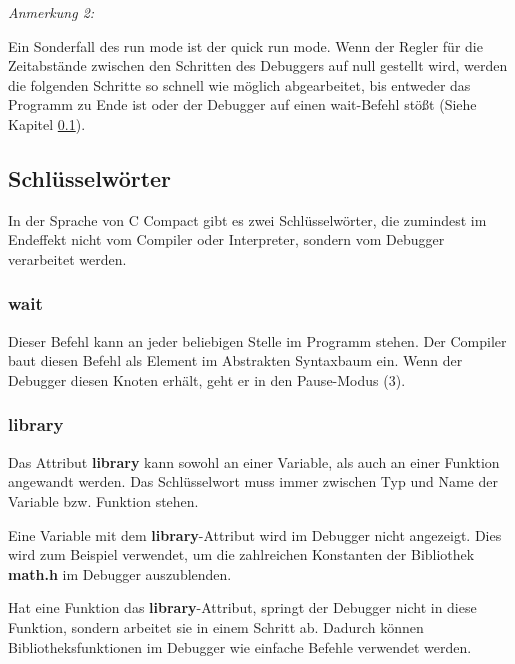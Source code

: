 \emph{Anmerkung 2:}
\par
\begingroup
\leftskip=1cm %
\noindent Ein Sonderfall des run mode ist der \glqq{}quick run mode\grqq{}. Wenn der Regler für die Zeitabstände zwischen den Schritten des Debuggers auf null gestellt wird, werden die folgenden Schritte so schnell wie möglich abgearbeitet, bis entweder das Programm zu Ende ist oder der Debugger auf einen \glqq{}wait\grqq{}-Befehl stößt (Siehe Kapitel \ref{}).
\par
\endgroup





\subsection{Schlüsselwörter}
In der Sprache von C Compact gibt es zwei Schlüsselwörter, die zumindest im Endeffekt nicht vom Compiler oder Interpreter, sondern vom Debugger verarbeitet werden.

\subsubsection*{wait}
Dieser Befehl kann an jeder beliebigen Stelle im Programm stehen. Der Compiler baut diesen Befehl als Element im Abstrakten Syntaxbaum ein. Wenn der Debugger diesen Knoten erhält, geht er in den Pause-Modus (3).

\subsubsection*{library}
Das Attribut \textbf{library} kann sowohl an einer Variable, als auch an einer Funktion angewandt werden. Das Schlüsselwort muss immer zwischen Typ und Name der Variable bzw. Funktion stehen.

Eine Variable mit dem \textbf{library}-Attribut wird im Debugger nicht angezeigt. Dies wird zum Beispiel verwendet, um die zahlreichen Konstanten der Bibliothek \textbf{math.h} im Debugger auszublenden.

Hat eine Funktion das \textbf{library}-Attribut, springt der Debugger nicht in diese Funktion, sondern arbeitet sie in einem Schritt ab. Dadurch können Bibliotheksfunktionen im Debugger wie einfache Befehle verwendet werden.
